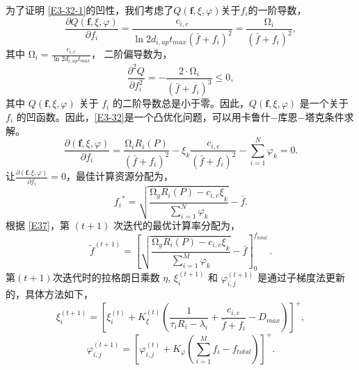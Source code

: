 为了证明 \eqref{E3-32-1}的凹性，我们考虑了$Q\left(\mathbf{f},\xi,\varphi\right)$关于$f_i$的一阶导数，
\begin{equation}\label{E34}
\!\!\frac{\partial Q\left(\mathbf{f},\xi,\varphi\right)}{\partial f_i}=\frac{c_{i,e}}{\ln{2} d_{i,up}t_{max}\left(\bar{f}+f_i\right)^2}=\frac{\mathrm{\Omega}_i}{\left(\bar{f}+f_i\right)^2},
\end{equation}
其中 $\mathrm{\Omega}_i=\frac{c_{i,e}}{\ln{2}d_{i,up}t_{max}}$， 二阶偏导数为，
\begin{equation}\label{E35}
\frac{\partial^2Q}{\partial f_i^2}=-\frac{2\cdot\mathrm{\Omega}_i}{\left(\bar{f}+f_i\right)^3}\le0,
\end{equation}
其中 $Q\left(\mathbf{f},\xi,\varphi\right)$ 关于 $f_i$ 的二阶导数总是小于零。因此，$Q\left(\mathbf{f},\xi,\varphi\right)$ 是一个关于 $f_i$ 的凹函数。因此，\eqref{E3-32}是一个凸优化问题，可以用卡鲁什$-$库恩$-$塔克条件求解。
\begin{equation}\label{E36}
\frac{\partial\left(\mathbf{f},\xi,\varphi\right)}{\partial f_i}=\frac{\mathrm{\Omega}_iR_i\left(P\right)}{\left(\bar{f}+f_i\right)^2}-\xi_k\frac{c_{i,e}}{\left(\bar{f}+f_i\right)^2}-\sum_{i=1}^{N}\varphi_k=0.
\end{equation}
让$\frac{\partial \left(\mathbf{f},\xi,\varphi\right)}{\partial f_i}=0$，最佳计算资源分配为，
\begin{equation}\label{E37}
{f_i}^\ast=\sqrt{\frac{\mathrm{\Omega}_yR_i\left(P\right)-{c_{i,e}\xi}_k}{\sum_{i=1}^{N}\varphi_k}}-\bar{f}.
\end{equation}
根据 \eqref{E37}，第 $(t+1)$ 次迭代的最优计算率分配为，
\begin{equation}\label{E38}
{\tilde{f}}^{\left(t+1\right)}=\left[\sqrt{\frac{\mathrm{\Omega}_yR_i\left(P\right)
-{c_{i,e}\xi}_k}{\sum_{i=1}^{M}\varphi_k}}-\bar{f}\right]_0^{f_{total}\ }.
\end{equation}
第$(t+1)$次迭代时的拉格朗日乘数 $\eta$, $\xi_i^{\left(t+1\right)}$ 和 $\varphi_{i,j}^{\left(t+1\right)}$ 是通过子梯度法更新的，具体方法如下，
\begin{equation}\label{E39}
\xi_i^{\left(t+1\right)}=\left[\xi_i^{\left(t\right)}\!+\!K_\xi^{\left(t\right)}\!\left(\frac{1}{\tau_iR_i
-\lambda_i}\!+\!\frac{c_{i,e}}{\bar{f}+f_i}\!-\!D_{max}\!\right)\!\right]^+,
\end{equation}
\begin{equation}
\varphi_{i,j}^{\left(t+1\right)}=\left[\varphi_{i,j}^{\left(t\right)}+K_\varphi\left(\sum_{i=1}^{M}f_i
-f_{total}\right)\right]^+.
\end{equation}
